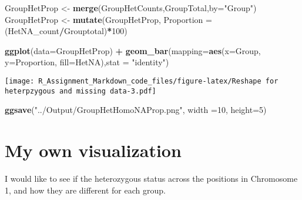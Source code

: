 \documentclass[]{article}
\newenvironment{Shaded}{\begin{snugshade}}{\end{snugshade}}
\newcommand{\KeywordTok}[1]{\textcolor[rgb]{0.13,0.29,0.53}{\textbf{#1}}}
\newcommand{\DataTypeTok}[1]{\textcolor[rgb]{0.13,0.29,0.53}{#1}}
\newcommand{\DecValTok}[1]{\textcolor[rgb]{0.00,0.00,0.81}{#1}}
\newcommand{\StringTok}[1]{\textcolor[rgb]{0.31,0.60,0.02}{#1}}
\newcommand{\OperatorTok}[1]{\textcolor[rgb]{0.81,0.36,0.00}{\textbf{#1}}}
\newcommand{\NormalTok}[1]{#1}
\begin{document}
\begin{Shaded}
\begin{Highlighting}[]
\NormalTok{GroupHetProp <-}\StringTok{ }\KeywordTok{merge}\NormalTok{(GroupHetCounts,GroupTotal,}\DataTypeTok{by=}\StringTok{"Group"}\NormalTok{)}
\NormalTok{GroupHetProp <-}\StringTok{ }\KeywordTok{mutate}\NormalTok{(GroupHetProp, }\DataTypeTok{Proportion =}\NormalTok{ (HetNA_count}\OperatorTok{/}\NormalTok{Grouptotal)}\OperatorTok{*}\DecValTok{100}\NormalTok{)}

\KeywordTok{ggplot}\NormalTok{(}\DataTypeTok{data=}\NormalTok{GroupHetProp) }\OperatorTok{+}\StringTok{ }\KeywordTok{geom_bar}\NormalTok{(}\DataTypeTok{mapping=}\KeywordTok{aes}\NormalTok{(}\DataTypeTok{x=}\NormalTok{Group, }\DataTypeTok{y=}\NormalTok{Proportion, }\DataTypeTok{fill=}\NormalTok{HetNA),}\DataTypeTok{stat =} \StringTok{"identity"}\NormalTok{)}
\end{Highlighting}
\end{Shaded}

\texttt{[image: R\_Assignment\_Markdown\_code\_files/figure-latex/Reshape for heterpzygous and missing data-3.pdf]}

\begin{Shaded}
\begin{Highlighting}[]
\KeywordTok{ggsave}\NormalTok{(}\StringTok{"../Output/GroupHetHomoNAProp.png"}\NormalTok{, }\DataTypeTok{width =}\DecValTok{10}\NormalTok{, }\DataTypeTok{height=}\DecValTok{5}\NormalTok{)}
\end{Highlighting}
\end{Shaded}

\section{My own visualization}\label{my-own-visualization}

I would like to see if the heterozygous status across the positions in
Chromosome 1, and how they are different for each group.
\end{document}
